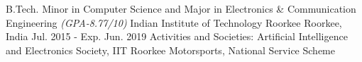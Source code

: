 

\begin{cventries}

  \cventry
    {B.Tech. Minor in Computer Science and Major in Electronics \& Communication Engineering \em(GPA-8.77/10)} %
    {Indian Institute of Technology Roorkee} %
    {Roorkee, India} %
    {Jul. 2015 - Exp. Jun. 2019} %
    {Activities and Societies: Artificial Intelligence and Electronics Society, IIT Roorkee Motorsports, National Service Scheme}
\end{cventries}
